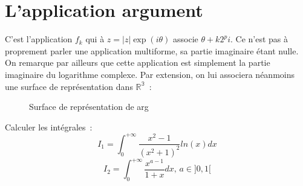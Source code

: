 \section{L'application argument}
C'est l'application $f_k$ qui à $z = |z| \exp (i \theta)$ associe
$\theta + k 2 ^pi$. Ce n'est pas à proprement parler une application
multiforme, sa partie imaginaire étant nulle. On remarque par ailleurs
que cette application est simplement la partie imaginaire du
logarithme complexe. Par extension, on lui associera néanmoins une
surface de représentation dans $\mathbb{R^3}$~:
\begin{figure}[h]
\caption{Surface de représentation de arg}\label{Fi:fig3}
\end{figure}
\begin{exercice}
Calculer les intégrales~:
\[
I_1 = \int_0^{+\infty} \frac{x^2-1}{(x^2+1)^2}ln(x)dx
\]
\[
I_2 = \int_0^{+\infty} \frac{x^{a-1}}{1+x}dx, \, a \in ]0, 1[
\]
\end{exercice}